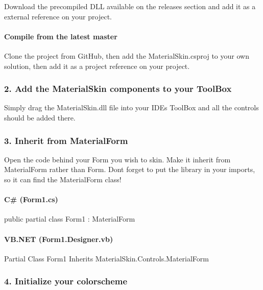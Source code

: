 Download the precompiled D\+LL available on the releases section and add it as a external reference on your project.

\paragraph*{Compile from the latest master}

Clone the project from Git\+Hub, then add the Material\+Skin.\+csproj to your own solution, then add it as a project reference on your project.

\subsubsection*{2. Add the Material\+Skin components to your Tool\+Box}

Simply drag the Material\+Skin.\+dll file into your I\+DE\textquotesingle{}s Tool\+Box and all the controls should be added there.

\subsubsection*{3. Inherit from Material\+Form}

Open the code behind your Form you wish to skin. Make it inherit from Material\+Form rather than Form. Don\textquotesingle{}t forget to put the library in your imports, so it can find the Material\+Form class!

\paragraph*{C\# (Form1.\+cs)}


\begin{DoxyCode}
\textcolor{keyword}{public} \textcolor{keyword}{partial class }Form1 : MaterialForm
\end{DoxyCode}


\paragraph*{V\+B.\+N\+ET (Form1.\+Designer.\+vb)}


\begin{DoxyCode}
Partial Class Form1
  Inherits MaterialSkin.Controls.MaterialForm
\end{DoxyCode}


\subsubsection*{4. Initialize your colorscheme}

